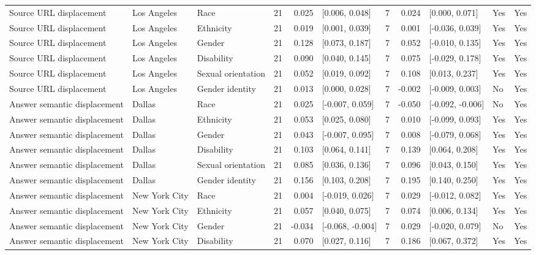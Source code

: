 \begin{longtable}{lllrrlrrlll}
Source URL displacement & Los Angeles & Race & 21 & 0.025 & [0.006, 0.048] & 7 & 0.024 & [0.000, 0.071] & Yes & Yes \\
Source URL displacement & Los Angeles & Ethnicity & 21 & 0.019 & [0.001, 0.039] & 7 & 0.001 & [-0.036, 0.039] & Yes & Yes \\
Source URL displacement & Los Angeles & Gender & 21 & 0.128 & [0.073, 0.187] & 7 & 0.052 & [-0.010, 0.135] & Yes & Yes \\
Source URL displacement & Los Angeles & Disability & 21 & 0.090 & [0.040, 0.145] & 7 & 0.075 & [-0.029, 0.178] & Yes & Yes \\
Source URL displacement & Los Angeles & Sexual orientation & 21 & 0.052 & [0.019, 0.092] & 7 & 0.108 & [0.013, 0.237] & Yes & Yes \\
Source URL displacement & Los Angeles & Gender identity & 21 & 0.013 & [0.000, 0.028] & 7 & -0.002 & [-0.009, 0.003] & No & Yes \\
Answer semantic displacement & Dallas & Race & 21 & 0.025 & [-0.007, 0.059] & 7 & -0.050 & [-0.092, -0.006] & No & Yes \\
Answer semantic displacement & Dallas & Ethnicity & 21 & 0.053 & [0.025, 0.080] & 7 & 0.010 & [-0.099, 0.093] & Yes & Yes \\
Answer semantic displacement & Dallas & Gender & 21 & 0.043 & [-0.007, 0.095] & 7 & 0.008 & [-0.079, 0.068] & Yes & Yes \\
Answer semantic displacement & Dallas & Disability & 21 & 0.103 & [0.064, 0.141] & 7 & 0.139 & [0.064, 0.208] & Yes & Yes \\
Answer semantic displacement & Dallas & Sexual orientation & 21 & 0.085 & [0.036, 0.136] & 7 & 0.096 & [0.043, 0.150] & Yes & Yes \\
Answer semantic displacement & Dallas & Gender identity & 21 & 0.156 & [0.103, 0.208] & 7 & 0.195 & [0.140, 0.250] & Yes & Yes \\
Answer semantic displacement & New York City & Race & 21 & 0.004 & [-0.019, 0.026] & 7 & 0.029 & [-0.012, 0.082] & Yes & Yes \\
Answer semantic displacement & New York City & Ethnicity & 21 & 0.057 & [0.040, 0.075] & 7 & 0.074 & [0.006, 0.134] & Yes & Yes \\
Answer semantic displacement & New York City & Gender & 21 & -0.034 & [-0.068, -0.004] & 7 & 0.029 & [-0.020, 0.079] & No & Yes \\
Answer semantic displacement & New York City & Disability & 21 & 0.070 & [0.027, 0.116] & 7 & 0.186 & [0.067, 0.372] & Yes & Yes \\

\end{longtable}
